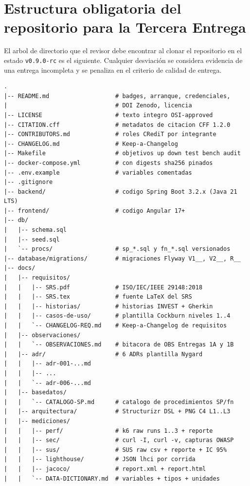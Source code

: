 \documentclass[11pt,a4paper]{article}
\begin{document}
\section{Estructura obligatoria del repositorio para la Tercera Entrega}

El arbol de directorio que el revisor debe encontrar al clonar el repositorio en el estado \texttt{v0.9.0-rc} es el siguiente. Cualquier desviaci\'{o}n se considera evidencia de una entrega incompleta y se penaliza en el criterio de calidad de entrega.

\begin{lstlisting}[caption={Estructura minima del repositorio para la Tercera Entrega}]
.
|-- README.md                   # badges, arranque, credenciales,
|                               # DOI Zenodo, licencia
|-- LICENSE                     # texto integro OSI-approved
|-- CITATION.cff                # metadatos de citacion CFF 1.2.0
|-- CONTRIBUTORS.md             # roles CRediT por integrante
|-- CHANGELOG.md                # Keep-a-Changelog
|-- Makefile                    # objetivos up down test bench audit
|-- docker-compose.yml          # con digests sha256 pinados
|-- .env.example                # variables comentadas
|-- .gitignore
|-- backend/                    # codigo Spring Boot 3.2.x (Java 21 LTS)
|-- frontend/                   # codigo Angular 17+
|-- db/
|   |-- schema.sql
|   |-- seed.sql
|   `-- procs/                  # sp_*.sql y fn_*.sql versionados
|-- database/migrations/        # migraciones Flyway V1__, V2__, R__
|-- docs/
|   |-- requisitos/
|   |   |-- SRS.pdf             # ISO/IEC/IEEE 29148:2018
|   |   |-- SRS.tex             # fuente LaTeX del SRS
|   |   |-- historias/          # historias INVEST + Gherkin
|   |   |-- casos-de-uso/       # plantilla Cockburn niveles 1..4
|   |   `-- CHANGELOG-REQ.md    # Keep-a-Changelog de requisitos
|   |-- observaciones/
|   |   `-- OBSERVACIONES.md    # bitacora de OBS Entregas 1A y 1B
|   |-- adr/                    # 6 ADRs plantilla Nygard
|   |   |-- adr-001-...md
|   |   |-- ...
|   |   `-- adr-006-...md
|   |-- basedatos/
|   |   `-- CATALOGO-SP.md      # catalogo de procedimientos SP/fn
|   |-- arquitectura/           # Structurizr DSL + PNG C4 L1..L3
|   |-- mediciones/
|   |   |-- perf/               # k6 raw runs 1..3 + reporte
|   |   |-- sec/                # curl -I, curl -v, capturas OWASP
|   |   |-- sus/                # SUS raw csv + reporte + IC 95%
|   |   |-- lighthouse/         # JSON lhci por corrida
|   |   |-- jacoco/             # report.xml + report.html
|   |   `-- DATA-DICTIONARY.md  # variables + tipos + unidades

\end{lstlisting}
\end{document}
